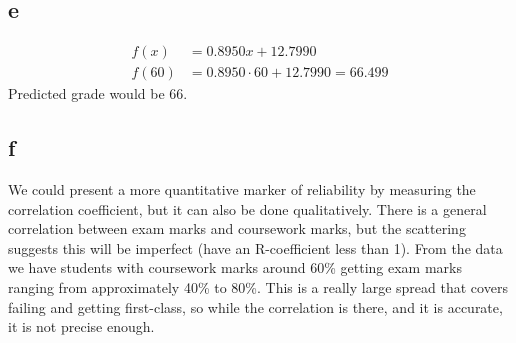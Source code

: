 \subsection{e}
\begin{equation}
\begin{split}
	f(x) &= 0.8950x + 12.7990 \\
	f(60) &= 0.8950\cdot 60 + 12.7990 = 66.499
\end{split}
\end{equation}
Predicted grade would be 66.
\subsection{f}
We could present a more quantitative marker of reliability by measuring the correlation coefficient, but it can also be done qualitatively.
There is a general correlation between exam marks and coursework marks, but the scattering suggests this will be imperfect (have an R-coefficient less than 1).
From the data we have students with coursework marks around 60\% getting exam marks ranging from approximately 40\% to 80\%.
This is a really large spread that covers failing and getting first-class, so while the correlation is there, and it is accurate, it is not precise enough. 
\pagebreak